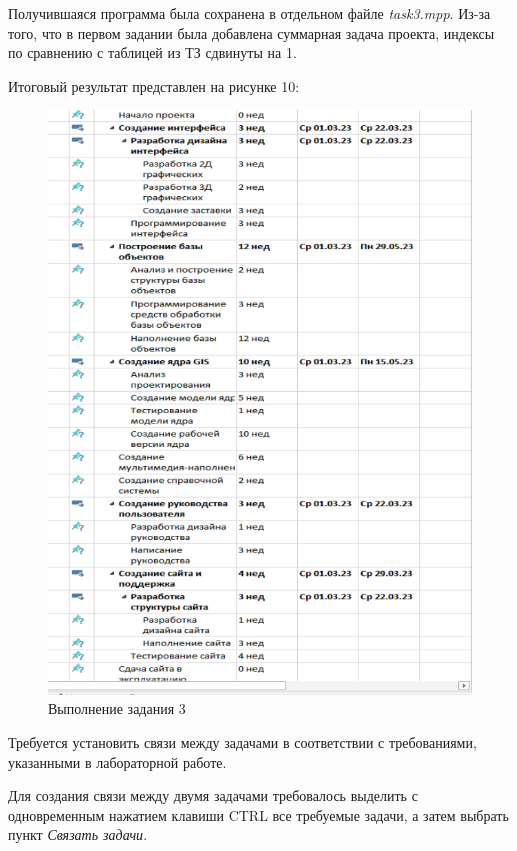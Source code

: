 Получившаяся программа была сохранена в отдельном файле \textit{task3.mpp}. 
Из-за того, что в первом задании была добавлена суммарная задача проекта, индексы по сравнению с таблицей из ТЗ сдвинуты на 1.

Итоговый результат представлен на рисунке 10:
\FloatBarrier
\begin{figure}[h]	
	\begin{center}
		\includegraphics[width=\linewidth]{inc/3-4.png}
	\end{center}
	\captionsetup{justification=centering}
	\caption{Выполнение задания 3}
\end{figure}
\FloatBarrier

Требуется установить связи между задачами в соответствии с требованиями, указанными в лабораторной работе.

Для создания связи между двумя задачами требовалось выделить с одновременным нажатием клавиши CTRL все требуемые задачи, а затем выбрать пункт \textit{Связать задачи}.

